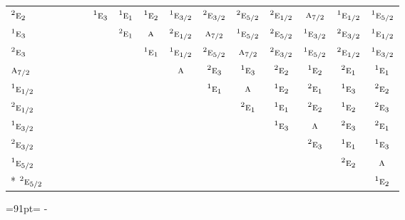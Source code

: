 \documentclass[10pt,a4paper]{article}
\newcommand{\needspace}[1]{\par\penalty-100\begingroup\dimen0=#1\relax\dimen2=\pagegoal
  \advance\dimen2-\pagetotal\ifdim\dimen0>\dimen2\relax\ifdim\dimen2>0pt\vfil\break\fi\fi
  \endgroup}
\numberwithin{equation}{section}
\newcommand{\irr}[1]{\text{\normalfont\scshape #1}}
\newcommand{\conjpair}[1]{{}^{#1}}
\begin{document}
{\begin{longtable}{@{}lcccccccccccccc@{}}
$\conjpair{2}\irr{e}_{2}$ &  &  &  &  & $\conjpair{1}\irr{e}_{3}$ & $\conjpair{1}\irr{e}_{1}$ & $\conjpair{1}\irr{e}_{2}$ & $\conjpair{1}\irr{e}_{3/2}$ & $\conjpair{2}\irr{e}_{3/2}$ & $\conjpair{2}\irr{e}_{5/2}$ & $\conjpair{2}\irr{e}_{1/2}$ & $\irr{a}_{7/2}$ & $\conjpair{1}\irr{e}_{1/2}$ & $\conjpair{1}\irr{e}_{5/2}$\\
$\conjpair{1}\irr{e}_{3}$ &  &  &  &  &  & $\conjpair{2}\irr{e}_{1}$ & $\irr{a}$ & $\conjpair{2}\irr{e}_{1/2}$ & $\irr{a}_{7/2}$ & $\conjpair{1}\irr{e}_{5/2}$ & $\conjpair{2}\irr{e}_{5/2}$ & $\conjpair{1}\irr{e}_{3/2}$ & $\conjpair{2}\irr{e}_{3/2}$ & $\conjpair{1}\irr{e}_{1/2}$\\
$\conjpair{2}\irr{e}_{3}$ &  &  &  &  &  &  & $\conjpair{1}\irr{e}_{1}$ & $\conjpair{1}\irr{e}_{1/2}$ & $\conjpair{2}\irr{e}_{5/2}$ & $\irr{a}_{7/2}$ & $\conjpair{2}\irr{e}_{3/2}$ & $\conjpair{1}\irr{e}_{5/2}$ & $\conjpair{2}\irr{e}_{1/2}$ & $\conjpair{1}\irr{e}_{3/2}$\\
$\irr{a}_{7/2}$ &  &  &  &  &  &  &  & $\irr{a}$ & $\conjpair{2}\irr{e}_{3}$ & $\conjpair{1}\irr{e}_{3}$ & $\conjpair{2}\irr{e}_{2}$ & $\conjpair{1}\irr{e}_{2}$ & $\conjpair{2}\irr{e}_{1}$ & $\conjpair{1}\irr{e}_{1}$\\
$\conjpair{1}\irr{e}_{1/2}$ &  &  &  &  &  &  &  &  & $\conjpair{1}\irr{e}_{1}$ & $\irr{a}$ & $\conjpair{1}\irr{e}_{2}$ & $\conjpair{2}\irr{e}_{1}$ & $\conjpair{1}\irr{e}_{3}$ & $\conjpair{2}\irr{e}_{2}$\\
$\conjpair{2}\irr{e}_{1/2}$ &  &  &  &  &  &  &  &  &  & $\conjpair{2}\irr{e}_{1}$ & $\conjpair{1}\irr{e}_{1}$ & $\conjpair{2}\irr{e}_{2}$ & $\conjpair{1}\irr{e}_{2}$ & $\conjpair{2}\irr{e}_{3}$\\
$\conjpair{1}\irr{e}_{3/2}$ &  &  &  &  &  &  &  &  &  &  & $\conjpair{1}\irr{e}_{3}$ & $\irr{a}$ & $\conjpair{2}\irr{e}_{3}$ & $\conjpair{2}\irr{e}_{1}$\\
$\conjpair{2}\irr{e}_{3/2}$ &  &  &  &  &  &  &  &  &  &  &  & $\conjpair{2}\irr{e}_{3}$ & $\conjpair{1}\irr{e}_{1}$ & $\conjpair{1}\irr{e}_{3}$\\
$\conjpair{1}\irr{e}_{5/2}$ &  &  &  &  &  &  &  &  &  &  &  &  & $\conjpair{2}\irr{e}_{2}$ & $\irr{a}$\\*
$\conjpair{2}\irr{e}_{5/2}$ &  &  &  &  &  &  &  &  &  &  &  &  &  & $\conjpair{1}\irr{e}_{2}$\\
\bottomrule\end{longtable}}
\needspace{91pt}
\end{document}
